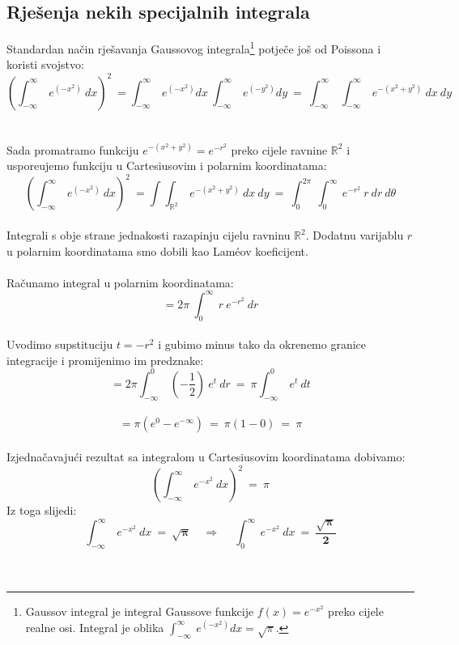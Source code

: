\documentclass[a4paper,12pt]{article}
\begin{document}
\subsection{Rje\v{s}enja nekih specijalnih integrala}
Standardan na\v{c}in rje\v{s}avanja Gaussovog integrala\footnote{Gaussov integral je integral Gaussove funkcije $f(x)=e^{-x^2}$ preko cijele realne osi.
Integral je oblika $\int_{-\infty}^{\infty}\ e^{(-x^2)}dx=\sqrt{\pi}$.} potje\v{c}e jo\v{s} od Poissona i koristi svojstvo:
\\
$$ \left( \int_{-\infty}^{\infty}\ e^{(-x^2)}\ dx \right)^2\ =\int_{-\infty}^{\infty}\ e^{(-x^2)}dx\  \int_{-\infty}^{\infty}\ e^{(-y^2)}dy\ =
\  \int_{-\infty}^{\infty}\ \int_{-\infty}^{\infty}\ e^{-(x^2+y^2)}\ dx\ dy $$
\\
\\
Sada promatramo funkciju $e^{-(x^2+y^2)}=e^{-r^2}$ preko cijele ravnine $\mathbb{R}^2$ i uspore\dj ujemo funkciju u Cartesiusovim i polarnim koordinatama:
\\
$$ \left( \int_{-\infty}^{\infty}\ e^{(-x^2)}\ dx \right)^2\ = \int \int_{\mathbb{R}^2}\ e^{-(x^2+y^2)}\ dx\ dy\ 
=\ \int_{0}^{2\pi}\ \int_{0}^{\infty}\ e^{-r^2}\ r\ dr\ d\theta $$
\\
Integrali s obje strane jednakosti razapinju cijelu ravninu $\mathbb{R}^2$.
Dodatnu varijablu $r$ u polarnim koordinatama smo dobili kao Lam\'{e}ov koeficijent.
\\
\\
Ra\v{c}unamo integral u polarnim koordinatama:
\\
$$ =2\pi\ \int_{0}^{\infty}\ r\ e^{-r^2}\ dr $$
\\
Uvodimo supstituciju $t=-r^2$ i gubimo minus tako da okrenemo granice integracije i promijenimo im predznake:
\\
$$ =2\pi \int_{-\infty}^{0}\ \left( -\frac{1}{2} \right) \ e^{t}\ dr\ =\ \pi \int_{-\infty}^{0}\ e^t\ dt $$
\\
$$ =\pi(e^0-e^{-\infty})\ =\ \pi(1-0)\ =\ \pi $$
\\
Izjedna\v{c}avaju\'ci rezultat sa integralom u Cartesiusovim koordinatama dobivamo:
\\
$$ \left( \int_{-\infty}^{\infty}\ e^{-x^2}\ dx \right)^2\ =\ \pi $$
\newpage
Iz toga slijedi:
\\
$$ \int_{-\infty}^{\infty}\ e^{-x^2}\ dx\ =\ \boldsymbol{\sqrt{\pi}} \quad \Rightarrow \quad \ \int_{0}^{\infty}\ e^{-x^2}\ dx\ =\ \boldsymbol{\frac{\sqrt{\pi}}{2}} $$
\\
\\
\end{document}
